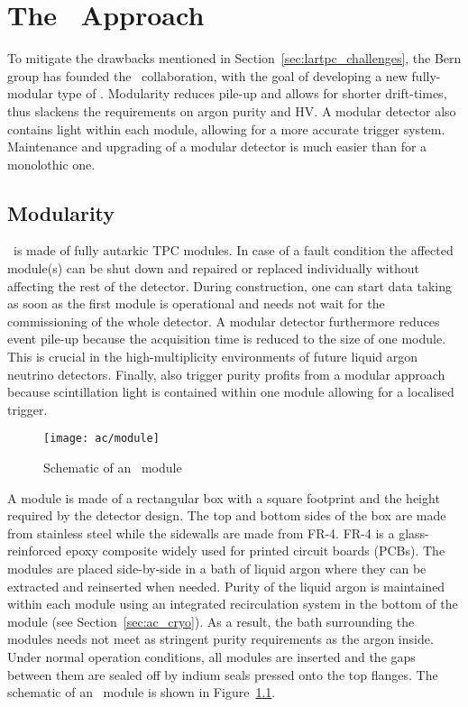 \chapter{The \AC\ Approach}
\label{chap:argoncube}

To mitigate the drawbacks mentioned in Section~\ref{sec:lartpc_challenges}, the Bern group has founded the \AC\ collaboration, with the goal of developing a new fully-modular type of \lartpc.
Modularity reduces pile-up and allows for shorter drift-times, thus slackens the requirements on argon purity and HV.
A modular detector also contains light within each module, allowing for a more accurate trigger system.
Maintenance and upgrading of a modular detector is much easier than for a monolothic one.


\section{Modularity}
\label{sec:ac_modularity}

\AC\ is made of fully autarkic TPC modules.
In case of a fault condition the affected module(s) can be shut down and repaired or replaced individually without affecting the rest of the detector.
During construction, one can start data taking as soon as the first module is operational and needs not wait for the commissioning of the whole detector.
A modular detector furthermore reduces event pile-up because the acquisition time is reduced to the size of one module.
This is crucial in the high-multiplicity environments of future liquid argon neutrino detectors.
Finally, also trigger purity profits from a modular approach because scintillation light is contained within one module allowing for a localised trigger.

\begin{figure}[htb] %
	\centering
	\texttt{[image: ac/module]}
	\caption{Schematic of an \AC\ module}
	\label{fig:ac_module}
\end{figure}

A module is made of a rectangular box with a square footprint and the height required by the detector design.
The top and bottom sides of the box are made from stainless steel while the sidewalls are made from FR-4.
FR-4 is a glass-reinforced epoxy composite widely used for printed circuit boards (PCBs).
The modules are placed side-by-side in a bath of liquid argon where they can be extracted and reinserted when needed.
Purity of the liquid argon is maintained within each module using an integrated recirculation system in the bottom of the module (see Section~\ref{sec:ac_cryo}).
As a result, the bath surrounding the modules needs not meet as stringent purity requirements as the argon inside.
Under normal operation conditions, all modules are inserted and the gaps between them are sealed off by indium seals pressed onto the top flanges.
The schematic of an \AC\ module is shown in Figure~\ref{fig:ac_module}.

